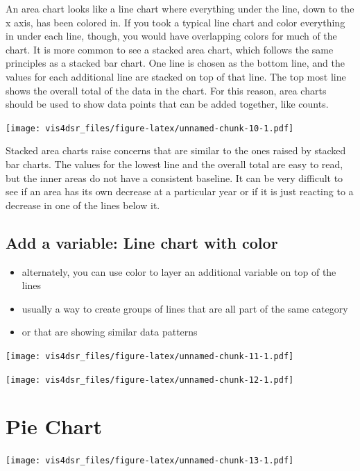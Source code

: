 \documentclass[
]{krantz}
\providecommand{\tightlist}{%
  \setlength{\itemsep}{0pt}\setlength{\parskip}{0pt}}
\begin{document}
An area chart looks like a line chart where everything under the line, down to the
x axis, has been colored in. If you took a typical line chart and color everything
in under each line, though, you would have overlapping colors for much of the chart.
It is more common to see a stacked area chart, which follows the same principles as
a stacked bar chart. One line is chosen as the bottom line, and the values for
each additional line are stacked on top of that line. The top most line shows the
overall total of the data in the chart. For this reason, area charts should be used
to show data points that can be added together, like counts.

\texttt{[image: vis4dsr\_files/figure-latex/unnamed-chunk-10-1.pdf]}

Stacked area charts raise concerns that are similar to the ones raised by stacked
bar charts. The values for the lowest line and the overall total are easy to
read, but the inner areas do not have a consistent baseline. It can be very difficult
to see if an area has its own decrease at a particular year or if it is just
reacting to a decrease in one of the lines below it.

\hypertarget{add-a-variable-line-chart-with-color}{%
\subsection{Add a variable: Line chart with color}\label{add-a-variable-line-chart-with-color}}

\begin{itemize}
\tightlist
\item
  alternately, you can use color to layer an additional variable on top of the lines
\item
  usually a way to create groups of lines that are all part of the same category
\item
  or that are showing similar data patterns
\end{itemize}

\texttt{[image: vis4dsr\_files/figure-latex/unnamed-chunk-11-1.pdf]}

\texttt{[image: vis4dsr\_files/figure-latex/unnamed-chunk-12-1.pdf]}

\hypertarget{pie-chart}{%
\section{Pie Chart}\label{pie-chart}}

\texttt{[image: vis4dsr\_files/figure-latex/unnamed-chunk-13-1.pdf]}
\end{document}
